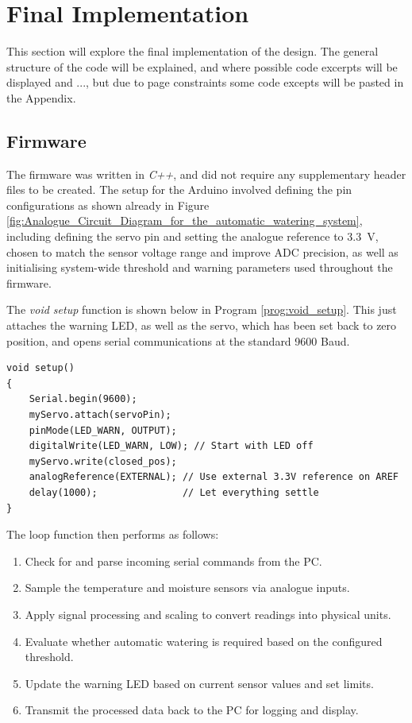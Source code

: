 \documentclass[a4paper,11pt]{article}
\begin{document}
\section{Final Implementation}
\label{sec:final_implementation}

This section will explore the final implementation of the design.
The general structure of the code will be explained, 
and where possible code excerpts will be displayed and ...,
but due to page constraints some code excepts will be pasted in the Appendix.

\subsection{Firmware}
\label{sec:firmware}

The firmware was written in \textit{C++}, and did not require any supplementary 
header files to be created.
The setup for the Arduino involved defining the pin configurations
as shown already in 
Figure \ref{fig:Analogue_Circuit_Diagram_for_the_automatic_watering_system},
including defining the servo pin and 
setting the analogue reference to \SI{3.3}{\volt}, 
chosen to match the sensor voltage range and improve ADC precision, 
as well as initialising system-wide threshold and 
warning parameters used throughout the firmware.

The \textit{void setup} function is shown below in 
Program \ref{prog:void_setup}. 
This just attaches the warning LED,
as well as the servo, which has been set back to zero position,
and opens serial communications at the standard 9600 Baud.

\begin{lstlisting}[style=cpp-style, 
    caption={\textit{void setup} function}, label={prog:void_setup}]
void setup()
{
    Serial.begin(9600);
    myServo.attach(servoPin);
    pinMode(LED_WARN, OUTPUT);
    digitalWrite(LED_WARN, LOW); // Start with LED off
    myServo.write(closed_pos);
    analogReference(EXTERNAL); // Use external 3.3V reference on AREF
    delay(1000);               // Let everything settle
}
\end{lstlisting}

The loop function then performs as follows: 

\begin{enumerate}[label=\Roman*., nosep]
    \item Check for and parse incoming serial commands from the PC.
    \item Sample the temperature and moisture sensors via analogue inputs.
    \item Apply signal processing and scaling to convert 
    readings into physical units.
    \item Evaluate whether automatic watering is required based on the configured threshold.
    \item Update the warning LED based on current sensor values and set limits.
    \item Transmit the processed data back to the PC for logging and display.
\end{enumerate}
\end{document}
